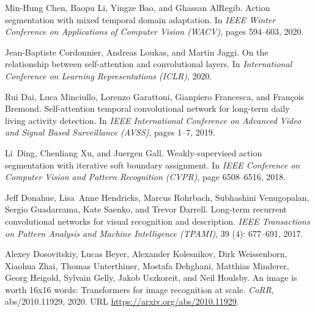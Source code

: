 \documentclass{bmvc2k}
\begin{document}
\begin{thebibliography}{53}
Min-Hung Chen, Baopu Li, Yingze Bao, and Ghassan AlRegib.
\newblock Action segmentation with mixed temporal domain adaptation.
\newblock In \emph{IEEE Winter Conference on Applications of Computer Vision
  (WACV)}, pages 594--603, 2020.

Jean-Baptiste Cordonnier, Andreas Loukas, and Martin Jaggi.
\newblock On the relationship between self-attention and convolutional layers.
\newblock In \emph{International Conference on Learning Representations
  (ICLR)}, 2020.

Rui Dai, Luca Minciullo, Lorenzo Garattoni, Gianpiero Francesca, and François
  Bremond.
\newblock Self-attention temporal convolutional network for long-term daily
  living activity detection.
\newblock In \emph{IEEE International Conference on Advanced Video and Signal
  Based Surveillance (AVSS)}, pages 1--7, 2019.

Li~Ding, Chenliang Xu, and Juergen Gall.
\newblock Weakly-supervised action segmentation with iterative soft boundary
  assignment.
\newblock In \emph{{IEEE} Conference on Computer Vision and Pattern Recognition
  (CVPR)}, page 6508–6516, 2018.

Jeff Donahue, Lisa~Anne Hendricks, Marcus Rohrbach, Subhashini Venugopalan,
  Sergio Guadarrama, Kate Saenko, and Trevor Darrell.
\newblock Long-term recurrent convolutional networks for visual recognition and
  description.
\newblock \emph{IEEE Transactions on Pattern Analysis and Machine Intelligence
  (TPAMI)}, 39 (4): 677--691, 2017.

Alexey Dosovitskiy, Lucas Beyer, Alexander Kolesnikov, Dirk Weissenborn,
  Xiaohua Zhai, Thomas Unterthiner, Mostafa Dehghani, Matthias Minderer, Georg
  Heigold, Sylvain Gelly, Jakob Uszkoreit, and Neil Houlsby.
\newblock An image is worth 16x16 words: Transformers for image recognition at
  scale.
\newblock \emph{CoRR}, abs/2010.11929, 2020.
\newblock URL \url{https://arxiv.org/abs/2010.11929}.


\end{thebibliography}
\end{document}
